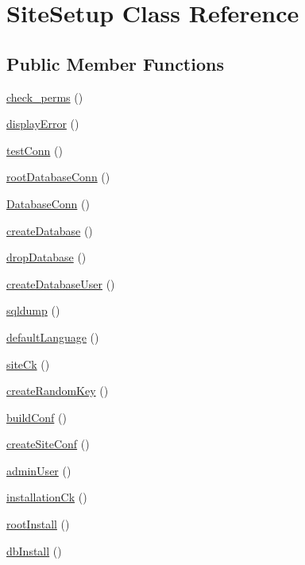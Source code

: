 \hypertarget{class_site_setup}{\section{\-Site\-Setup \-Class \-Reference}
\label{class_site_setup}
}
\subsection*{\-Public \-Member \-Functions}
\begin{DoxyCompactItemize}
\item 
\hyperlink{class_site_setup_ab4920bc7ac1bf06d64c30929d181eea0}{check\-\_\-perms} ()
\item 
\hyperlink{class_site_setup_a41e11067cfa2051a0dc3ed754125d2fc}{display\-Error} ()
\item 
\hyperlink{class_site_setup_a35e67a12255f121da699974d16fe6efb}{test\-Conn} ()
\item 
\hyperlink{class_site_setup_a2a955adae297d16f675239fc149102f3}{root\-Database\-Conn} ()
\item 
\hyperlink{class_site_setup_a66099bebb0357ca9c022e6562efce6ee}{\-Database\-Conn} ()
\item 
\hyperlink{class_site_setup_a0bafc21f9e81182323fab395c762a92d}{create\-Database} ()
\item 
\hyperlink{class_site_setup_a4444ee2ac45cbcee4fb9309ddf48276c}{drop\-Database} ()
\item 
\hyperlink{class_site_setup_adb084b1ee20d9f459662cdfe9f8b9e61}{create\-Database\-User} ()
\item 
\hyperlink{class_site_setup_ae20bd8c9efcdf59af2c292ed70797c63}{sqldump} ()
\item 
\hyperlink{class_site_setup_afc89039dc0f39b3b276b4721b368fb22}{default\-Language} ()
\item 
\hyperlink{class_site_setup_a69b2f18c933bcb3fc7b83ea54469e8d8}{site\-Ck} ()
\item 
\hyperlink{class_site_setup_a7e7b1209cae00a17b1845b818fac2362}{create\-Random\-Key} ()
\item 
\hyperlink{class_site_setup_adc0fa98599113ec9394ae61fe7983b7f}{build\-Conf} ()
\item 
\hyperlink{class_site_setup_a54a057d179507279024217d73ebfe079}{create\-Site\-Conf} ()
\item 
\hyperlink{class_site_setup_a2b634ab98d01e59c675d42d49c17e2f5}{admin\-User} ()
\item 
\hyperlink{class_site_setup_a97b2ea31bd58ecf0534c83ec5f1ea012}{installation\-Ck} ()
\item 
\hyperlink{class_site_setup_abd5574200b79c721f0c3502baab6952c}{root\-Install} ()
\item 
\hyperlink{class_site_setup_a92b862fdf9e419a923ce9ce73c0a91dc}{db\-Install} ()
\end{DoxyCompactItemize}
